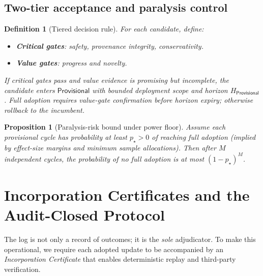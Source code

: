 \documentclass[11pt,a4paper]{article}
\newtheorem{proposition}[theorem]{Proposition}
\newtheorem{definition}{Definition}[section]
\newcommand{\Prov}{\mathsf{Provisional}}
\begin{document}
\subsection{Two-tier acceptance and paralysis control}
\begin{definition}[Tiered decision rule]
For each candidate, define:
\begin{itemize}[leftmargin=*]
\item \textbf{Critical gates}: safety, provenance integrity, conservativity.
\item \textbf{Value gates}: progress and novelty.
\end{itemize}
If critical gates pass and value evidence is promising but incomplete, the candidate enters $\Prov$ with bounded deployment scope and horizon $H_{\Prov}$.
Full adoption requires value-gate confirmation before horizon expiry; otherwise rollback to the incumbent.
\end{definition}

\begin{proposition}[Paralysis-risk bound under power floor]
Assume each provisional cycle has probability at least $p_\star>0$ of reaching full adoption (implied by effect-size margins and minimum sample allocations).
Then after $M$ independent cycles, the probability of no full adoption is at most $(1-p_\star)^M$.
\end{proposition}


\section{Incorporation Certificates and the Audit-Closed Protocol}

The log is not only a record of outcomes; it is the \emph{sole} adjudicator. To make this operational, we require each adopted update to be accompanied by an \emph{Incorporation Certificate} that enables deterministic replay and third-party verification.
\end{document}
